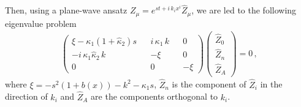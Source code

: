\documentclass[reprint,aps,amsmath,amssymb,twoside,prd,showkeys,superscriptaddress,nofootinbib]{revtex4-2}
\begin{document}
Then, using a plane-wave ansatz $Z_{\mu}=e^{st+i\,k_ix^i}\hat{Z}_{\mu}$, we are led to the following eigenvalue problem
\begin{eqnarray}\label{mat_damping}
\begin{pmatrix}
\xi-\kappa_1(1+\hat{\kappa}_2)s && i\,\kappa_1\,k && 0 \\
-i\,\kappa_1\hat{\kappa}_2\,k && -\xi && 0 \\
0 && 0 && -\xi
\end{pmatrix}
\begin{pmatrix}
\hat{Z}_0 \\ \hat{Z}_n \\ \hat{Z}_A
\end{pmatrix}
=0\,,
\end{eqnarray}
where $\xi=-s^2(1+b(x))-k^2-\kappa_1s$, $\hat{Z}_n$ is the component of $\hat{Z}_i$ in the direction of $k_i$ and $\hat{Z}_A$ are the components orthogonal to $k_i$.
\end{document}
